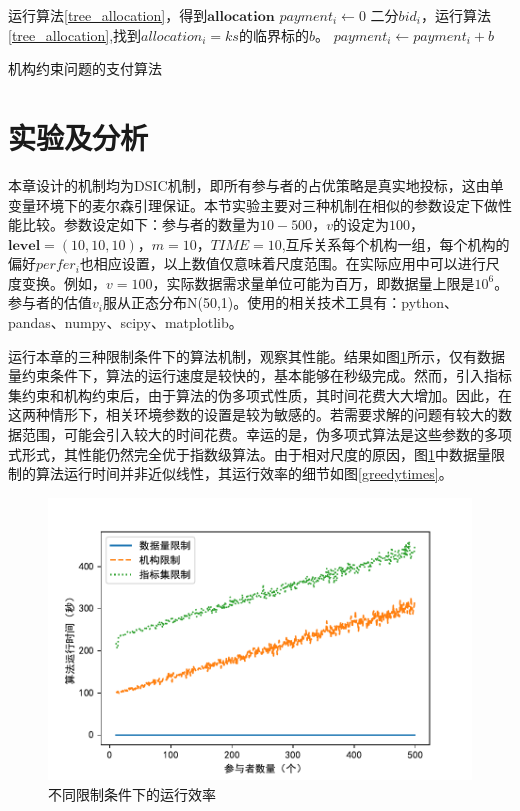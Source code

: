 \documentclass[promaster]{thesis-uestc}
\begin{document}
\begin{algorithm}[h]
    运行算法\ref{tree_allocation}，得到$\mathbf{allocation}$\;
    {
        $payment_i \leftarrow 0$\;
        {
            二分$bid_i$，运行算法\ref{tree_allocation},找到$allocation_i = ks$的临界标的$b$。
            $payment_i \leftarrow payment_i + b$
        }
    }
\caption{机构约束问题的支付算法}
\label{tree_zhifu}
\end{algorithm}

\FloatBarrier

\section{实验及分析}
本章设计的机制均为DSIC机制，即所有参与者的占优策略是真实地投标，这由单变量环境下的麦尔森引理保证。本节实验主要对三种机制在相似的参数设定下做性能比较。参数设定如下：参与者的数量为$10-500$，$v$的设定为$100$，$\mathbf{level}=(10,10,10)$，$m=10$，$TIME=10$,互斥关系每个机构一组，每个机构的偏好$perfer_i$也相应设置，以上数值仅意味着尺度范围。在实际应用中可以进行尺度变换。例如，$v=100$，实际数据需求量单位可能为百万，即数据量上限是$10^6$。参与者的估值$v_i$服从正态分布N(50,1)。使用的相关技术工具有：python、pandas、numpy、scipy、matplotlib。

运行本章的三种限制条件下的算法机制，观察其性能。结果如图\ref{times}所示，仅有数据量约束条件下，算法的运行速度是较快的，基本能够在秒级完成。然而，引入指标集约束和机构约束后，由于算法的伪多项式性质，其时间花费大大增加。因此，在这两种情形下，相关环境参数的设置是较为敏感的。若需要求解的问题有较大的数据范围，可能会引入较大的时间花费。幸运的是，伪多项式算法是这些参数的多项式形式，其性能仍然完全优于指数级算法。由于相对尺度的原因，图\ref{times}中数据量限制的算法运行时间并非近似线性，其运行效率的细节如图\ref{greedytimes}。

\begin{figure}[H]
    \includegraphics[width=350pt]{exp/threetimes.pdf}
    \caption{不同限制条件下的运行效率}
    \label{times}
\end{figure}
\end{document}
